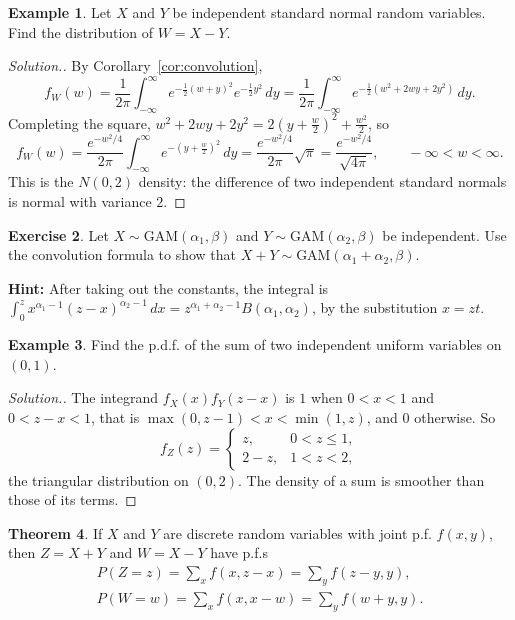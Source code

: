 \documentclass[12pt,a4paper]{report}
\theoremstyle{definition}
\newtheorem{thm}{Theorem}[section]
\newtheorem{example}[thm]{Example}
\newtheorem{exe}[thm]{Exercise}
\theoremstyle{plain}
\newenvironment{solution}
  {\renewcommand{\qedsymbol}{}\begin{proof}[\textit{Solution}.]}
  {\end{proof}}
\begin{document}
\begin{example}
\label{ex:normaldiff}
Let $X$ and $Y$ be independent standard normal random variables. Find the
distribution of $W = X-Y$.
\end{example}

\begin{solution}
By Corollary~\ref{cor:convolution},
\[f_W(w) = \frac{1}{2\pi} \int^{\infty}_{-\infty} e^{-\frac{1}{2}(w + y)^2}
e^{-\frac{1}{2}y^2}\, dy = \frac{1}{2\pi} \int^{\infty}_{-\infty} e^{-\frac{1}{2}(w^2
+ 2wy + 2y^2)}\, dy .\]
Completing the square, $w^2 + 2wy + 2y^2 = 2\left(y + \frac{w}{2}\right)^2 +
\frac{w^2}{2}$, so
\[f_W(w) = \frac{e^{-w^2/4}}{2\pi}\int^{\infty}_{-\infty}e^{-\left(y +
\frac{w}{2}\right)^2}\,dy = \frac{e^{-w^2/4}}{2\pi}\sqrt\pi =
\frac{e^{-w^2/4}}{\sqrt{4\pi}} ,\qquad -\infty < w < \infty .\]
This is the $N(0,2)$ density: the difference of two independent standard normals
is normal with variance $2$.
\end{solution}

\begin{exe}
\label{exe:gammasum}
Let $X\sim\text{GAM}(\alpha_1, \beta)$ and $Y\sim\text{GAM}(\alpha_2, \beta)$ be
independent. Use the convolution formula to show that
$X + Y \sim\text{GAM}(\alpha_1 + \alpha_2, \beta)$.

\textbf{Hint:} After taking out the constants, the integral is
$\int_0^zx^{\alpha_1 - 1}(z - x)^{\alpha_2 - 1}\,dx = z^{\alpha_1 + \alpha_2 -
1}B(\alpha_1,\alpha_2)$, by the substitution $x = zt$.
\end{exe}

\begin{example}
\label{ex:uniformsum}
Find the p.d.f. of the sum of two independent uniform variables on $(0,1)$.
\end{example}

\begin{solution}
The integrand $f_X(x)f_Y(z - x)$ is $1$ when $0<x<1$ and $0<z - x<1$, that is
$\max(0,z - 1)<x<\min(1,z)$, and $0$ otherwise. So
\[f_Z(z) =
\begin{cases}
z, & 0<z\leq 1,\\
2 - z, & 1<z<2 ,
\end{cases}\]
the triangular distribution on $(0,2)$. The density of a sum is smoother than
those of its terms.
\end{solution}

\begin{thm}
\label{thm:sumdiscrete}
If $X$ and $Y$ are discrete random variables with joint p.f. $f(x,y)$, then
$Z = X + Y$ and $W = X - Y$ have p.f.s
\begin{gather*}
P(Z = z) = \sum_x f(x,z - x) = \sum_y f(z - y,y),\\
P(W = w) = \sum_x f(x, x - w) = \sum_y f(w + y,y) .
\end{gather*}
\end{thm}
\end{document}
